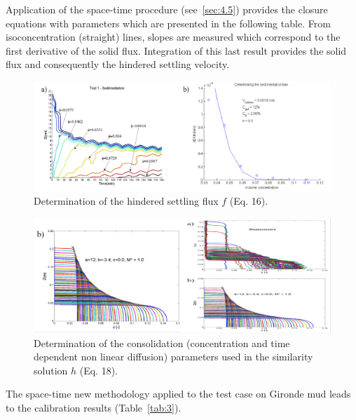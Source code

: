 Application of the space-time procedure (see~\ref{sec:4.5}) provides the closure
equations with parameters which are presented in the following table. From
isoconcentration (straight) lines, slopes are measured which correspond to
the first derivative of the solid flux. Integration of this last result
provides the solid flux and consequently the hindered settling velocity.

\begin{figure}[H]
\begin{center}
\includegraphics[scale=0.2,angle=0]{graphics/fig10.png}
\caption{Determination of the hindered settling flux $f$ (Eq. 16).}\label{fig:10}
\end{center}
\end{figure}

\begin{figure}[H]
\begin{center}
\includegraphics[scale=0.35,angle=0]{graphics/fig11.png}
\caption{Determination of the consolidation (concentration and time dependent non
linear diffusion) parameters used in the similarity solution $h$ (Eq. 18).}\label{fig:11}
\end{center}
\end{figure}

The space-time new methodology applied to the test case on Gironde mud leads
to the calibration results (Table~\ref{tab:3}).


